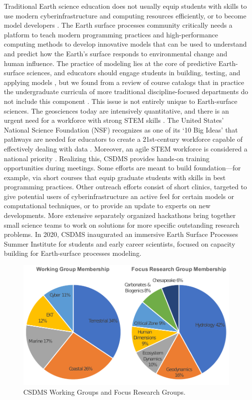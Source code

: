 \documentclass{article} %
\begin{document}
Traditional Earth science education does not usually equip students with skills to use modern cyberinfrastructure and computing resources efficiently, or to become model developers \citep{campbell2013taking}. The Earth surface processes community critically needs a platform to teach modern programming practices and high-performance computing methods to develop innovative models that can be used to understand and predict how the Earth’s surface responds to environmental change and human influence.
The practice of modeling lies at the core of predictive Earth-surface sciences, and educators should engage students in building, testing, and applying models \citep{hestenes1996modeling,manduca2008making}, but we found from a review of course catalogs that in practice the undergraduate curricula of more traditional discipline-focused departments do not include this component \citep{campbell2013taking}. This issue is not entirely unique to Earth-surface sciences. The geosciences today are intensively quantitative, and there is an urgent need for a workforce with strong STEM skills \citep{national2012discipline}. The United States' National Science Foundation (NSF) recognizes as one of its `10 Big Ideas' that pathways are needed for educators to create a 21st-century workforce capable of effectively dealing with data \citep{king2017reimagining}. Moreover, an agile STEM workforce is considered a national priority \citep{atkins2011national}. Realizing this, CSDMS provides hands-on training opportunities during meetings. Some efforts are meant to build foundation---for example, via short courses that equip graduate students with skills in best programming practices. Other outreach efforts consist of short clinics, targeted to give potential users of cyberinfrastructure an active feel for certain models or computational techniques, or to provide an update to experts on new developments. More extensive separately organized hackathons bring together small science teams to work on solutions for more specific outstanding research problems.  In 2020, CSDMS inaugurated an immersive Earth Surface Processes Summer Institute for students and early career scientists, focused on capacity building for Earth-surface processes modeling.

\begin{figure}[h!]
\centering
\includegraphics[scale=0.9]{Figures/working_and_focus_groups.pdf}
\caption{CSDMS Working Groups and Focus Research Groups.}
\label{fig:groups}
\end{figure}
\end{document}
